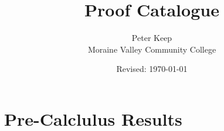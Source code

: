 \documentclass[12pt]{book}
\title{Proof Catalogue}
\author{Peter Keep\\ Moraine Valley Community College}
\date{Revised: \today}
\begin{document}
\maketitle

\tableofcontents
\restoregeometry

\chapter{Pre-Calclulus Results}


\end{document}
